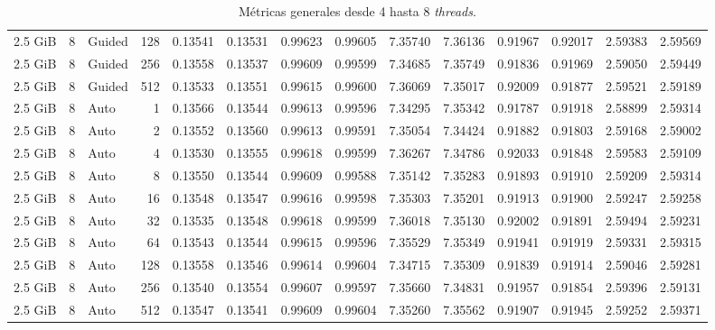 \begin{table}[H]
\begin{adjustbox}{width=\textwidth, keepaspectratio}
\begin{tabular}{rrlrrrrrrrrrrr}
                    2.5 GiB & 8 & Guided & 128 & 0.13541 & 0.13531 & 0.99623 & 0.99605 & 7.35740 & 7.36136 & 0.91967 & 0.92017 & 2.59383 & 2.59569 \\
                    2.5 GiB & 8 & Guided & 256 & 0.13558 & 0.13537 & 0.99609 & 0.99599 & 7.34685 & 7.35749 & 0.91836 & 0.91969 & 2.59050 & 2.59449 \\
                    2.5 GiB & 8 & Guided & 512 & 0.13533 & 0.13551 & 0.99615 & 0.99600 & 7.36069 & 7.35017 & 0.92009 & 0.91877 & 2.59521 & 2.59189 \\
                    2.5 GiB & 8 & Auto & 1 & 0.13566 & 0.13544 & 0.99613 & 0.99596 & 7.34295 & 7.35342 & 0.91787 & 0.91918 & 2.58899 & 2.59314 \\
                    2.5 GiB & 8 & Auto & 2 & 0.13552 & 0.13560 & 0.99613 & 0.99591 & 7.35054 & 7.34424 & 0.91882 & 0.91803 & 2.59168 & 2.59002 \\
                    2.5 GiB & 8 & Auto & 4 & 0.13530 & 0.13555 & 0.99618 & 0.99599 & 7.36267 & 7.34786 & 0.92033 & 0.91848 & 2.59583 & 2.59109 \\
                    2.5 GiB & 8 & Auto & 8 & 0.13550 & 0.13544 & 0.99609 & 0.99588 & 7.35142 & 7.35283 & 0.91893 & 0.91910 & 2.59209 & 2.59314 \\
                    2.5 GiB & 8 & Auto & 16 & 0.13548 & 0.13547 & 0.99616 & 0.99598 & 7.35303 & 7.35201 & 0.91913 & 0.91900 & 2.59247 & 2.59258 \\
                    2.5 GiB & 8 & Auto & 32 & 0.13535 & 0.13548 & 0.99618 & 0.99599 & 7.36018 & 7.35130 & 0.92002 & 0.91891 & 2.59494 & 2.59231 \\
                    2.5 GiB & 8 & Auto & 64 & 0.13543 & 0.13544 & 0.99615 & 0.99596 & 7.35529 & 7.35349 & 0.91941 & 0.91919 & 2.59331 & 2.59315 \\
                    2.5 GiB & 8 & Auto & 128 & 0.13558 & 0.13546 & 0.99614 & 0.99604 & 7.34715 & 7.35309 & 0.91839 & 0.91914 & 2.59046 & 2.59281 \\
                    2.5 GiB & 8 & Auto & 256 & 0.13540 & 0.13554 & 0.99607 & 0.99597 & 7.35660 & 7.34831 & 0.91957 & 0.91854 & 2.59396 & 2.59131 \\
                    2.5 GiB & 8 & Auto & 512 & 0.13547 & 0.13541 & 0.99609 & 0.99604 & 7.35260 & 7.35562 & 0.91907 & 0.91945 & 2.59252 & 2.59371 \\
                    \bottomrule
                \end{tabular}
            \end{adjustbox}
            \caption{Métricas generales desde 4 hasta 8 \textit{threads}.}
            \label{tab:distance_metrics_2}
        \end{table}

